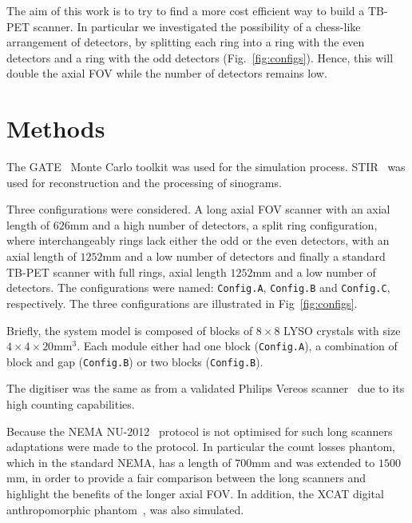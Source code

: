 \documentclass{IEEEtran}
\begin{document}
The aim of this work is to try to find a more cost efficient way to build a TB-PET scanner.
In particular we investigated the possibility of a chess-like arrangement of detectors, by splitting each ring into a ring with the even detectors and a ring with the odd detectors (Fig.~\ref{fig:configs}). Hence, this will double the axial FOV while the number of detectors remains low. 

\vspace{-0.2cm}

\section{Methods}
The GATE~\cite{Jan2004} Monte Carlo toolkit was used for the simulation process. STIR~\cite{Thielemans2012P, Efthimiou2019ImplementationLibrary} was used for reconstruction and the processing of sinograms.

Three configurations were considered. A long axial FOV scanner with an axial length of $626$mm and a high number of detectors, a split ring configuration, where interchangeably rings lack either the odd or the even detectors, with an axial length of $1252$mm and a low number of detectors and finally a standard TB-PET scanner with full rings, axial length $1252$mm and a low number of detectors. The configurations were named: \texttt{Config.A}, \texttt{Config.B} and \texttt{Config.C}, respectively. The three configurations are illustrated in Fig~\ref{fig:configs}. 

Briefly, the system model is composed of blocks of $8 \times 8$ LYSO crystals with size $4 \times 4 \times 20$mm$^3$.  Each module either had one block (\texttt{Config.A}), a combination of block and gap (\texttt{Config.B}) or two blocks (\texttt{Config.B}).

The digitiser was the same as from a validated Philips Vereos scanner~\cite{Rausch2019PerformanceStandard} due to its high counting capabilities. 

Because the NEMA NU-2012~\cite{NationalElectricalManufacturersAssociation2012Performance2-2012} protocol is not optimised for such long scanners adaptations were made to the protocol. In particular the count losses phantom, which in the standard NEMA, has a length of $700$mm and was extended to $1500$mm, in order to provide a fair comparison between the long scanners and highlight the benefits of the longer axial FOV. In addition, the XCAT digital anthropomorphic phantom~\cite{Segars20104DResearch}, was also simulated.
\end{document}
